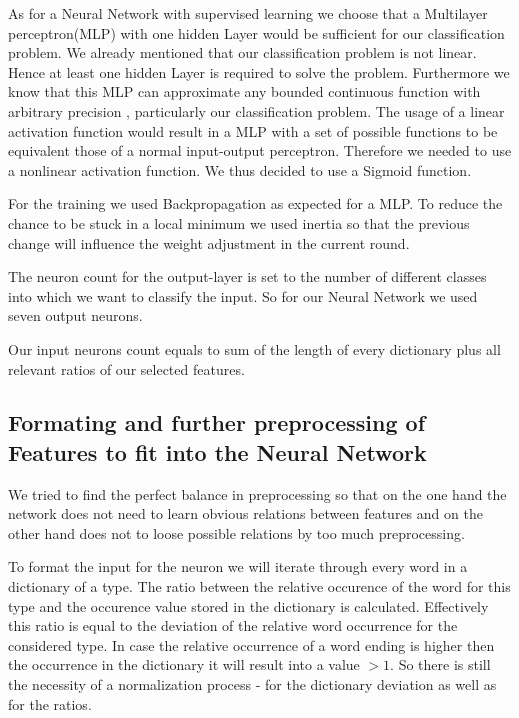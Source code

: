 \documentclass[paper=A4,pagesize=auto,12pt,headinclude=true,footinclude=true,BCOR=0mm,DIV=calc]{scrartcl}
\begin{document}
As for a Neural Network with supervised learning we choose that a Multilayer perceptron(MLP) with one hidden Layer would be sufficient for our classification problem. We already mentioned that our classification problem is not linear. Hence at least one hidden Layer is required to solve the problem. Furthermore we know that this MLP can approximate any bounded continuous function with arbitrary precision \cite{ApproximateAnyFunction}, particularly our classification problem.
The usage of a linear activation function would result in a MLP with a set of possible functions to be equivalent those of a normal input-output perceptron. Therefore we needed to use a nonlinear activation function. We thus decided to use a Sigmoid function. 

For the training we used Backpropagation as expected for a MLP. To reduce the chance to be stuck in a local minimum we used inertia so that the previous change will influence the weight adjustment in the current round.

The neuron count for the output-layer is set to the number of different classes into which we want to classify the input. So for our Neural Network we used seven output neurons.

Our input neurons count equals to sum of the length of every dictionary plus all relevant ratios of our selected features.

\subsection{Formating and further preprocessing of Features to fit into the Neural Network}
We tried to find the perfect balance in preprocessing so that on the one hand the network does not need to learn obvious relations between features and on the other hand does not to loose possible relations by too much preprocessing.

To format the input for the neuron we will iterate through every word in a dictionary of a type. The ratio between the relative occurence of the word for this type and the occurence value stored in the dictionary is calculated. Effectively this ratio is equal to the deviation of the relative word occurrence for the considered type. In case the relative occurrence of a word ending is higher then the occurrence in the dictionary it will result into a value $> 1$. So there is still the necessity of a normalization process - for the dictionary deviation as well as for the ratios.
\end{document}
